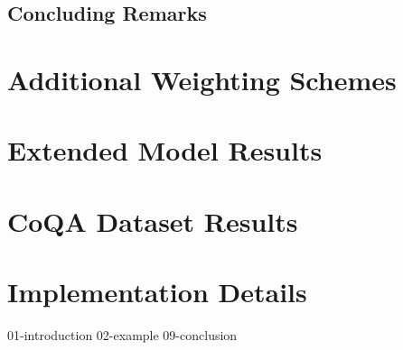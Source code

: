 \documentclass[a4paper,oneside,10pt,ngerman,english]{scrbook}
\begin{document}
\section{Concluding Remarks}

\appendix
\chapter{Additional Weighting Schemes}
\chapter{Extended Model Results}
\chapter{CoQA Dataset Results}
\chapter{Implementation Details}
\label{app:impl}

{01-introduction}
{02-example}
{09-conclusion}

\end{document}
